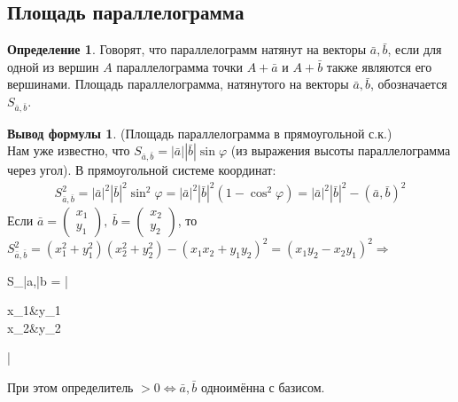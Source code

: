 \documentclass[a4paper, 12pt]{article}
\renewcommand{\phi}{\varphi}
\theoremstyle{definition}
\newtheorem*{definition}{Определение}
\newtheorem*{formula}{Вывод формулы}
\newenvironment{boxedalign*}
  {\begin{equation*}\begin{lrbox}{\boxedalignbox}$\begin{aligned}}
  {\end{aligned}$\end{lrbox}\fbox{\usebox{\boxedalignbox}}\end{equation*}}
\begin{document}
	\subsection{Площадь параллелограмма}
	\begin{definition}
		Говорят, что параллелограмм натянут на векторы $\bar{a}, \bar{b}$, если для одной из вершин $A$ параллелограмма точки $A + \bar{a}$ и $A + \bar{b}$ также являются его вершинами. Площадь параллелограмма, натянутого на векторы $\bar{a}, \bar{b}$, обозначается $S_{\bar{a},\bar{b}}$.
	\end{definition}
	\begin{formula}(Площадь параллелограмма в прямоугольной с.к.)\\
		Нам уже известно, что $S_{\bar{a},\bar{b}} = |\bar{a}||\bar{b}|\sin\phi$ (из выражения высоты параллелограмма через угол). В прямоугольной системе координат:\begin{align*}
			S_{\bar{a},\bar{b}}^2 = |\bar{a}|^2|\bar{b}|^2\sin^2\phi = |\bar{a}|^2|\bar{b}|^2(1 - \cos^2\phi) = |\bar{a}|^2|\bar{b}|^2 - (\bar{a}, \bar{b})^2
		\end{align*}
		Если $\bar{a} = \begin{pmatrix} x_1 \\ y_1 \end{pmatrix}, \ \bar{b} = \begin{pmatrix} x_2 \\ y_2 \end{pmatrix}$, то $S_{\bar{a},\bar{b}}^2 = (x_1^2 + y_1^2)(x_2^2 + y_2^2) - (x_1x_2 + y_1y_2)^2 = (x_1y_2 - x_2y_1)^2 \Rightarrow$ \begin{boxedalign*}S_{\bar{a},\bar{b}} = |\begin{vmatrix} x_1&y_1\\x_2&y_2 \end{vmatrix}|\end{boxedalign*}
		При этом определитель $>0 \Leftrightarrow \bar{a}, \bar{b}$ одноимённа с базисом.
	\end{formula}
\end{document}
